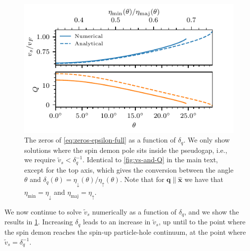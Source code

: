 \documentclass[aps,prb,reprint,twocolumns,superscriptaddress,nofootinbib]{revtex4-2}
\newcommand{\pg}[1]{\textcolor{red}{PG: #1}}
\newcommand{\xx}{\hat{\bm{x}}}
\begin{document}
	\begin{figure}
		\includegraphics{angles_vs_and_Q_with_eta}
		\caption{The zeros of \cref{eq:zeros-epsilon-full} as a function of $\delta_q$. We only show solutions where the spin demon pole sits inside the pseudogap, i.e., we require $\tilde v_s<\delta_q^{-1}$. Identical to \cref{fig:vs-and-Q} in the main text, except for the top axis, which gives the conversion between the angle $\theta$ and $\delta_q(\theta)=\eta_\downarrow(\theta)/\eta_\uparrow(\theta)$.
			Note that for $\bm q\parallel\xx$ we have that $\eta_{\mathrm{min}}=\eta_{\downarrow}$ and $\eta_{\mathrm{maj}}=\eta_{\uparrow}$. \label{fig:vs-poles}}
	\end{figure}
	
	
	
	
	
	
	We now continue to solve  $\tilde v_s$ numerically as a function of $\delta_q$, and we show the results in \cref{fig:vs-poles}.  Increasing $\delta_q$ leads to an increase in $\tilde v_s$, up until to the point where the spin demon reaches the spin-up particle-hole continuum, at the point where  $\tilde v_s=\delta_q^{-1}$.
	
\end{document}
